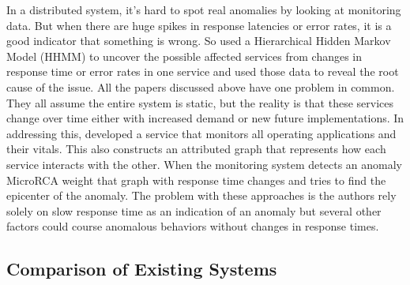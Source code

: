 In a distributed system, it's hard to spot real anomalies by looking at monitoring data. But when there are huge spikes in response latencies or error rates, it is a good indicator that something is wrong. So \cite{samir2019dla} used a Hierarchical Hidden Markov Model (HHMM) to uncover the possible affected services from changes in response time or error rates in one service and used those data to reveal the root cause of the issue. All the papers discussed above have one problem in common. They all assume the entire system is static, but the reality is that these services change over time either with increased demand or new future implementations. In addressing this, \cite{wu2020microrca} developed a service that monitors all operating applications and their vitals. This also constructs an attributed graph that represents how each service interacts with the other. When the monitoring system detects an anomaly MicroRCA weight that graph with response time changes and tries to find the epicenter of the anomaly. The problem with these approaches is the authors rely solely on slow response time as an indication of an anomaly but several other factors could course anomalous behaviors without changes in response times.

\subsection{Comparison of Existing Systems}

